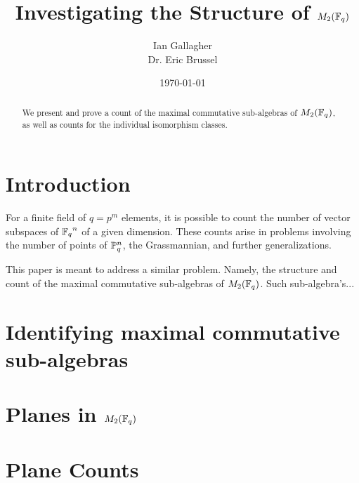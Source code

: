 \documentclass{amsart}
\title{Investigating the Structure of $M_2(\protect\mathbb{F}_q)$}
\author{Ian Gallagher \\ Dr. Eric Brussel}
\date{\today}
\begin{document}
\maketitle

\begin{abstract}
    We present and prove a count of the maximal commutative sub-algebras of
    $M_2(\protect\mathbb{F}_q)$, as well as counts for the individual isomorphism classes. 
\end{abstract}

\section{Introduction}
For a finite field of $q = p^m$ elements, it is possible to count the number of
vector subspaces of ${\protect\mathbb{F}_q}^n$ of a given dimension. These counts arise in
problems involving the number of points of $\protect\mathbb{P}^n_q$, the Grassmannian,
and further generalizations. %

This paper is meant to address a similar problem. Namely, the structure and 
count of the maximal commutative sub-algebras of $M_2(\protect\mathbb{F}_q)$. Such
sub-algebra's...

\section{Identifying maximal commutative sub-algebras}


\section{Planes in $M_2(\protect\mathbb{F}_q)$}


\section{Plane Counts}
\end{document}
